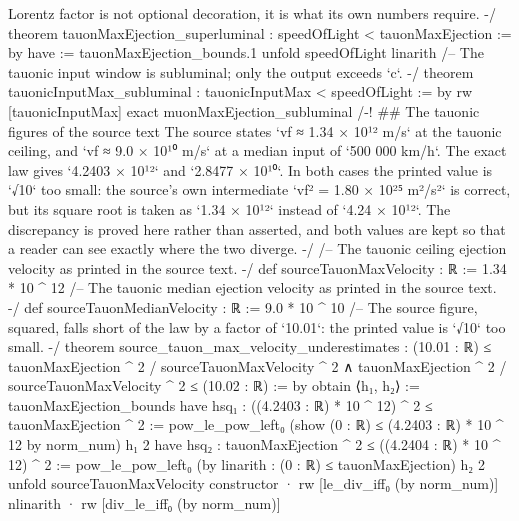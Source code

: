 \documentclass[11pt,a4paper]{article}
\begin{document}
{Lorentz factor is not optional decoration, it is what its own numbers require. -/
theorem tauonMaxEjection\_\allowbreak{}superluminal : speedOfLight \textless{} tauonMaxEjection := by
  have := tauonMaxEjection\_\allowbreak{}bounds.1
  unfold speedOfLight
  linarith
\mbox{}
/-- The tauonic input window is subluminal; only the output exceeds `c`. -/
theorem tauonicInputMax\_\allowbreak{}subluminal : tauonicInputMax \textless{} speedOfLight := by
  rw [tauonicInputMax]
  exact muonMaxEjection\_\allowbreak{}subluminal
\mbox{}
/-! \#\# The tauonic figures of the source text
\mbox{}
The source states `vf ≈ 1.34 × 10¹² m/s` at the tauonic ceiling, and
`vf ≈ 9.0 × 10¹⁰ m/s` at a median input of `500 000 km/h`.  The exact law gives
`4.2403 × 10¹²` and `2.8477 × 10¹⁰`.  In both cases the printed value is `√10`
too small: the source's own intermediate `vf² = 1.80 × 10²⁵ m²/s²` is correct,
but its square root is taken as `1.34 × 10¹²` instead of `4.24 × 10¹²`.  The
discrepancy is proved here rather than asserted, and both values are kept so
that a reader can see exactly where the two diverge.
-/
\mbox{}
/-- The tauonic ceiling ejection velocity as printed in the source text. -/
def sourceTauonMaxVelocity : ℝ := 1.34 * 10 \textasciicircum{} 12
\mbox{}
/-- The tauonic median ejection velocity as printed in the source text. -/
def sourceTauonMedianVelocity : ℝ := 9.0 * 10 \textasciicircum{} 10
\mbox{}
/-- The source figure, squared, falls short of the law by a factor of `10.01`:
the printed value is `√10` too small. -/
theorem source\_\allowbreak{}tauon\_\allowbreak{}max\_\allowbreak{}velocity\_\allowbreak{}underestimates :
    (10.01 : ℝ) ≤ tauonMaxEjection \textasciicircum{} 2 / sourceTauonMaxVelocity \textasciicircum{} 2 ∧
      tauonMaxEjection \textasciicircum{} 2 / sourceTauonMaxVelocity \textasciicircum{} 2 ≤ (10.02 : ℝ) := by
  obtain ⟨h₁, h₂⟩ := tauonMaxEjection\_\allowbreak{}bounds
  have hsq₁ : ((4.2403 : ℝ) * 10 \textasciicircum{} 12) \textasciicircum{} 2 ≤ tauonMaxEjection \textasciicircum{} 2 :=
    pow\_\allowbreak{}le\_\allowbreak{}pow\_\allowbreak{}left₀ (show (0 : ℝ) ≤ (4.2403 : ℝ) * 10 \textasciicircum{} 12 by norm\_\allowbreak{}num) h₁ 2
  have hsq₂ : tauonMaxEjection \textasciicircum{} 2 ≤ ((4.2404 : ℝ) * 10 \textasciicircum{} 12) \textasciicircum{} 2 :=
    pow\_\allowbreak{}le\_\allowbreak{}pow\_\allowbreak{}left₀ (by linarith : (0 : ℝ) ≤ tauonMaxEjection) h₂ 2
  unfold sourceTauonMaxVelocity
  constructor
  · rw [le\_\allowbreak{}div\_\allowbreak{}iff₀ (by norm\_\allowbreak{}num)]
    nlinarith
  · rw [div\_\allowbreak{}le\_\allowbreak{}iff₀ (by norm\_\allowbreak{}num)]
}
\end{document}
